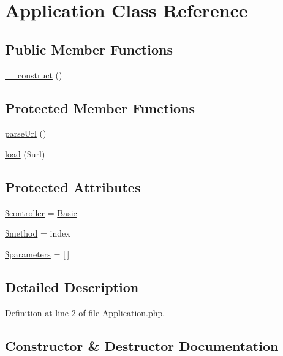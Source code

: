 \hypertarget{class_application}{}\section{Application Class Reference}
\label{class_application}
\subsection*{Public Member Functions}
\begin{DoxyCompactItemize}
\item 
\hyperlink{class_application_a97620cd12b475b39007c29c63885a373}{\+\_\+\+\_\+construct} ()
\end{DoxyCompactItemize}
\subsection*{Protected Member Functions}
\begin{DoxyCompactItemize}
\item 
\hyperlink{class_application_ac3007e038071f04135b5fcfcfdf9318c}{parse\+Url} ()
\item 
\hyperlink{class_application_aa434ce8a8cbcdd334e051004084edce9}{load} (\$url)
\end{DoxyCompactItemize}
\subsection*{Protected Attributes}
\begin{DoxyCompactItemize}
\item 
\hyperlink{class_application_aa3217a9bc7c7247a2807cd28ae2a3f1e}{\$controller} = \textquotesingle{}\hyperlink{class_basic}{Basic}\textquotesingle{}
\item 
\hyperlink{class_application_a35c1bd1b0587da413cb79a663dae84a6}{\$method} = \textquotesingle{}index\textquotesingle{}
\item 
\hyperlink{class_application_a9cb01d8979a55808cd1e1e5b74b1e3f6}{\$parameters} = \mbox{[}$\,$\mbox{]}
\end{DoxyCompactItemize}


\subsection{Detailed Description}


Definition at line 2 of file Application.\+php.



\subsection{Constructor \& Destructor Documentation}
\hypertarget{class_application_a97620cd12b475b39007c29c63885a373}{}\label{class_application_a97620cd12b475b39007c29c63885a373} 
